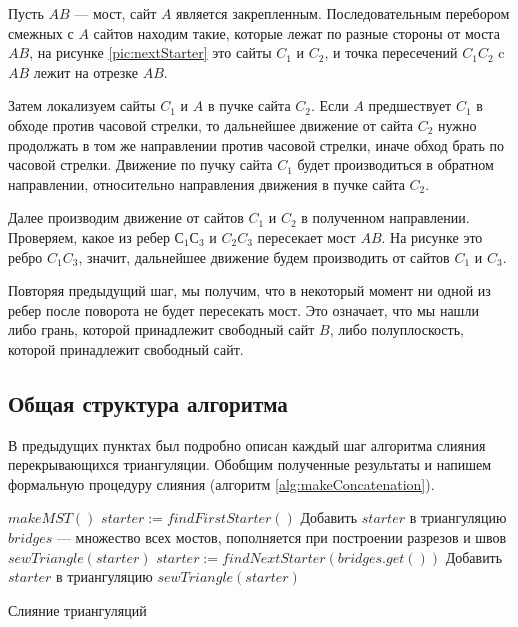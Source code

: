 \documentclass[12pt]{article}
\begin{document}
\newpage
Пусть $AB$ --- мост, сайт $A$ является закрепленным. Последовательным перебором смежных с $A$ сайтов находим такие, которые лежат по разные стороны от моста $AB$, на рисунке \ref{pic:nextStarter} это сайты $C_1$ и $C_2$, и точка пересечений $C_1C_2$ c $AB$ лежит на отрезке $AB$.

Затем локализуем сайты $C_1$ и $A$ в пучке сайта $C_2$. Если $A$ предшествует $C_1$ в обходе против часовой стрелки, то дальнейшее движение от сайта $C_2$ нужно продолжать в том же направлении против часовой стрелки, иначе обход брать по часовой стрелки. Движение по пучку сайта $C_1$ будет производиться в обратном направлении, относительно направления движения в пучке сайта $C_2$.

Далее производим движение от сайтов $C_1$ и $C_2$ в полученном направлении. Проверяем, какое из ребер $С_1С_3$ и $C_2C_3$ пересекает мост $AB$. На рисунке это ребро $C_1C_3$, значит, дальнейшее движение будем производить от сайтов $C_1$ и $C_3$.

Повторяя предыдущий шаг, мы получим, что в некоторый момент ни одной из ребер после поворота не будет пересекать мост. Это означает, что мы нашли либо грань, которой принадлежит свободный сайт $B$, либо полуплоскость, которой принадлежит свободный сайт.

\subsection{Общая структура алгоритма}
В предыдущих пунктах был подробно описан каждый шаг алгоритма слияния перекрывающихся триангуляции.
Обобщим полученные результаты и напишем формальную процедуру слияния (алгоритм \ref{alg:makeConcatenation}).

\begin{algorithm}[htb!]
\begin{algorithmic}[1]
	\State $makeMST()$
	\State $starter := findFirstStarter()$
	\State Добавить $starter$ в триангуляцию
	\State $bridges$ --- множество всех мостов, пополняется при построении разрезов и швов
	\State $sewTriangle(starter)$
		\State $starter := findNextStarter(bridges.get())$
		\State Добавить $starter$ в триангуляцию
		\State $sewTriangle(starter)$
	\EndWhile
\EndProcedure
\end{algorithmic}
\caption{Слияние триангуляций}
\label{alg:makeConcatenation}
\end{algorithm}
\end{document}
